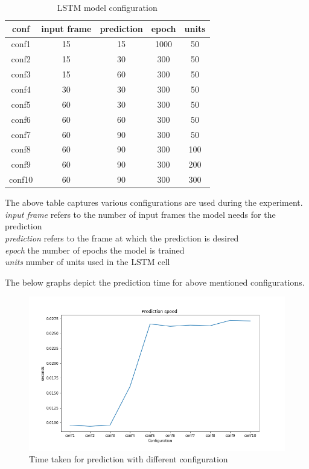 \begin {table}[H]
\begin{center}
 \begin{tabular}{||c c c c c||} 
 \hline
conf & input frame & prediction & epoch & units\\ [1.0ex] 
\hline\hline
conf1 & 15 & 15 & 1000 & 50 \\ 
\hline
conf2 & 15 & 30 & 300 & 50 \\ 
\hline
conf3 & 15 & 60 & 300 & 50 \\ 
\hline
conf4 & 30 & 30 & 300 & 50 \\ 
\hline
conf5 & 60 & 30 & 300 & 50 \\ 
\hline
conf6 & 60 & 60 & 300 & 50 \\ 
\hline
conf7 & 60 & 90 & 300 & 50 \\ 
\hline
conf8 & 60 & 90 & 300 & 100 \\ 
\hline
conf9 & 60 & 90 & 300 & 200 \\ 
\hline
conf10 & 60 & 90 & 300 & 300 \\ 
\hline
\end{tabular}
\caption{LSTM model configuration}
\end{center}
\end{table}
The above table captures various configurations are used during the experiment. \\
\textit{input frame} refers to the number of input frames the model needs for the prediction \\
\textit{prediction} refers to the frame at which the prediction is desired \\
\textit{epoch } the number of epochs the model is trained \\
\textit{units} number of units used in the LSTM cell

The below graphs depict the prediction time for above mentioned configurations.

\begin{figure}[H]
\includegraphics[scale=0.8]{time-taken-for-prediction.png}
\begin{center}
\caption{Time taken for prediction with different configuration}
\end{center}
\end{figure}

